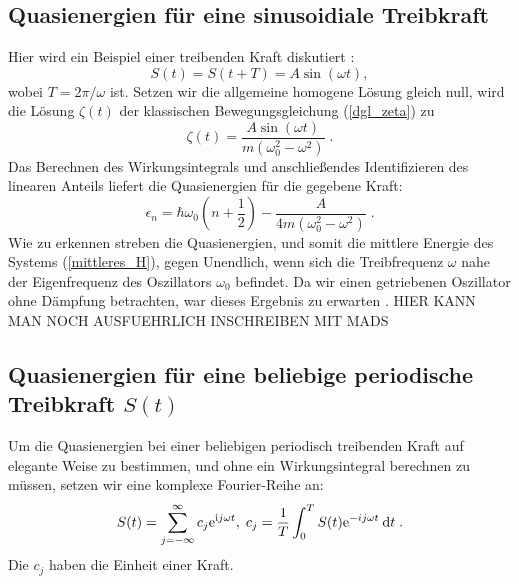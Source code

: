   \subsection{Quasienergien für eine sinusoidiale Treibkraft}
    Hier wird ein Beispiel einer treibenden Kraft diskutiert \cite{haenggi}:
    \begin{equation}
      S(t) = S(t+T) = A\sin(\omega t),
    \end{equation}
    wobei $T=2\pi / \omega$ ist.
    Setzen wir die allgemeine homogene Lösung gleich null, wird die Lösung $\zeta(t)$ der klassischen Bewegungsgleichung (\ref{dgl_zeta}) zu \cite{mads}
    \begin{equation}
      \zeta(t) = \frac{A\sin(\omega t)}{m(\omega_0^2 - \omega^2)} \; .
    \end{equation}
    Das Berechnen des Wirkungsintegrals und anschließendes Identifizieren des linearen Anteils liefert die Quasienergien für die gegebene Kraft:
    \begin{equation}
      \epsilon_n  = \hbar \omega_0\left(n+\frac{1}{2}\right) - \frac{A}{4m(\omega_0^2-\omega^2)} \;.
    \end{equation}
    Wie zu erkennen streben die Quasienergien, und somit die mittlere Energie des Systems (\ref{mittleres_H}), gegen Unendlich, wenn sich die Treibfrequenz $\omega$ nahe der Eigenfrequenz des Oszillators $\omega_0 $ befindet.
    Da wir einen getriebenen Oszillator ohne Dämpfung betrachten, war dieses Ergebnis zu erwarten \cite{mads}.
    HIER KANN MAN NOCH AUSFUEHRLICH INSCHREIBEN MIT MADS


\subsection{Quasienergien für eine beliebige periodische Treibkraft $S(t)$}
  \label{epsilon_bel_kraft}
  Um die Quasienergien bei einer beliebigen periodisch treibenden Kraft auf elegante Weise zu bestimmen, und ohne ein Wirkungsintegral berechnen zu müssen, setzen wir eine komplexe Fourier-Reihe an:
  \begin{equation}
    S(t) = \sum_{j=-\infty}^\infty c_j \text e^{\text ij\omega t}, \; c_j = \frac{1}{T} \int_0^T S(t) \text e^{-ij\omega t} \: \text d t \; .
  \end{equation}
  Die $c_j$ haben die Einheit einer Kraft.

